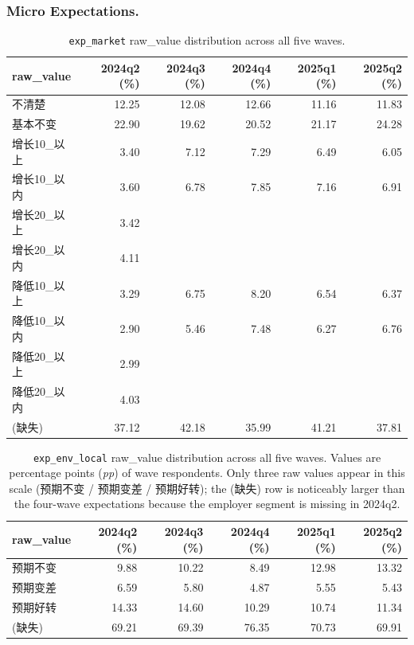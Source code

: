 \documentclass[11pt,letterpaper,english,final]{article}
\begin{document}
\newpage
\subsubsection{Micro Expectations.}
\begin{table}[H]
\centering
\small
\setlength{\tabcolsep}{5pt}
\caption{\texttt{exp\_market} raw\_value distribution across all five waves.}
\label{tab:exp_market_dist}
\begin{tabular}{@{}l r r r r r@{}}
\toprule
{raw\_value} & {2024q2 (\%)} & {2024q3 (\%)} & {2024q4 (\%)} & {2025q1 (\%)} & {2025q2 (\%)} \\
\midrule
不清楚        & 12.25 & 12.08 & 12.66 & 11.16 & 11.83 \\
基本不变      & 22.90 & 19.62 & 20.52 & 21.17 & 24.28 \\
增长10\_以上  & 3.40  & 7.12  & 7.29  & 6.49  & 6.05  \\
增长10\_以内  & 3.60  & 6.78  & 7.85  & 7.16  & 6.91  \\
增长20\_以上  & 3.42  &       &       &       &       \\
增长20\_以内  & 4.11  &       &       &       &       \\
降低10\_以上  & 3.29  & 6.75  & 8.20  & 6.54  & 6.37  \\
降低10\_以内  & 2.90  & 5.46  & 7.48  & 6.27  & 6.76  \\
降低20\_以上  & 2.99  &       &       &       &       \\
降低20\_以内  & 4.03  &       &       &       &       \\
\midrule
(缺失)        & 37.12 & 42.18 & 35.99 & 41.21 & 37.81 \\
\bottomrule
\end{tabular}
\end{table}

\begin{table}[H]
\centering
\small
\setlength{\tabcolsep}{6pt}
\caption{\texttt{exp\_env\_local} raw\_value distribution across all five waves. Values are percentage points (\textit{pp}) of wave respondents. Only three raw values appear in this scale (预期不变 / 预期变差 / 预期好转); the (缺失) row is noticeably larger than the four-wave expectations because the employer segment is missing in 2024q2.}
\label{tab:exp_env_local_dist}
\begin{tabular}{@{}l r r r r r@{}}
\toprule
{raw\_value} & {2024q2 (\%)} & {2024q3 (\%)} & {2024q4 (\%)} & {2025q1 (\%)} & {2025q2 (\%)} \\
\midrule
预期不变  & 9.88  & 10.22 & 8.49  & 12.98 & 13.32 \\
预期变差  & 6.59  & 5.80  & 4.87  & 5.55  & 5.43  \\
预期好转  & 14.33 & 14.60 & 10.29 & 10.74 & 11.34 \\
\midrule
(缺失)    & 69.21 & 69.39 & 76.35 & 70.73 & 69.91 \\
\bottomrule
\end{tabular}
\end{table}
\end{document}

